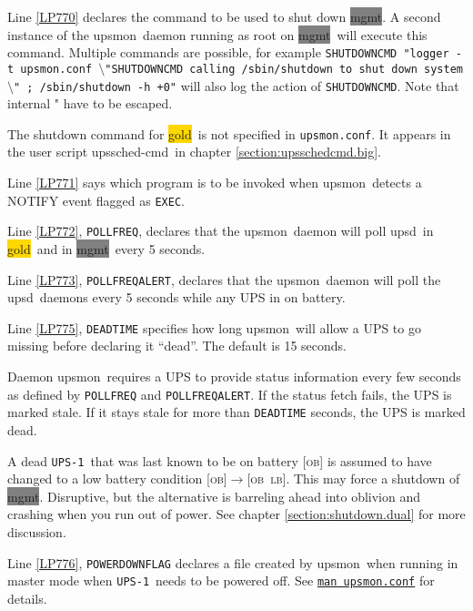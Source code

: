 \documentclass[12pt]{article}
\newcommand{\bsl}{$\setminus$}       %
\newcommand{\upsd}{\mbox{\textcolor{UPSDCOLOUR}{upsd}}}
\newcommand{\upsmon}{\mbox{\textcolor{MONCOLOUR}{upsmon}}}
\newcommand{\upsschedcmd}{\mbox{\textcolor{CMDCOLOUR}{upssched-cmd}}}
\newcommand{\gold}[1][gold]{\colorbox{GOLD}{#1}}
\newcommand{\mgmt}[1][mgmt]{\colorbox{GRAY}{#1}}
\newcommand{\LB}{\textcolor{UPSDCOLOUR}{\textsc{lb}}}
\newcommand{\OB}{\textcolor{UPSDCOLOUR}{\textsc{ob}}}
\newcommand{\status}[1]{\textcolor{UPSDCOLOUR}{[{#1}]}}
\newcommand{\statuschange}[2]{\status{#1}{\allowbreak}\textcolor{UPSDCOLOUR}{$\rightarrow$}{\allowbreak}\status{#2}}
\newcommand{\UPSi}{\texttt{UPS-1}}
\newcommand{\upsmonconf}{\textcolor{MONCOLOUR}{\texttt{upsmon.conf}}}
\newcommand{\NUTman}[1]{\href{http://networkupstools.org/docs/man/#1.html}{\texttt{man #1}}}
\begin{document}
Line \ref{LP770} declares the command to be used to shut down \mgmt.  A second
instance of the \upsmon\ daemon running as root on \mgmt\ will execute this
command.  Multiple commands are possible, for example \texttt{SHUTDOWNCMD
  "logger -t upsmon.conf \bsl"SHUTDOWNCMD calling /sbin/shutdown to shut down
  system\bsl" ; /sbin/shutdown -h +0"} will also log the action of
\texttt{SHUTDOWNCMD}.  Note that internal " have to be escaped.

The shutdown command for \gold\ is not specified in \upsmonconf.  It appears
in the user script \upsschedcmd\ in chapter \ref{section:upsschedcmd.big}.

Line \ref{LP771} says which program is to be invoked when \upsmon\ detects a
NOTIFY event flagged as \texttt{EXEC}.

Line \ref{LP772}, \texttt{POLLFREQ}, declares that the \upsmon\ daemon will
poll \upsd\ in \gold\ and in \mgmt\ every 5 seconds.

Line \ref{LP773}, \texttt{POLLFREQALERT}, declares that the \upsmon\ daemon
will poll the \upsd\ daemons every 5 seconds while any UPS in on battery.

Line \ref{LP775}, \texttt{DEADTIME} specifies how long \upsmon\ will allow a
UPS to go missing before declaring it ``dead''. The default is 15 seconds.

Daemon \upsmon\ requires a UPS to provide status information every few seconds
as defined by \texttt{POLLFREQ} and \texttt{POLLFREQALERT}. If the status
fetch fails, the UPS is marked stale. If it stays stale for more than
\texttt{DEADTIME} seconds, the UPS is marked dead.

A dead \UPSi\ that was last known to be on battery \status{\OB} is assumed to
have changed to a low battery condition \statuschange{\OB}{\OB\ \LB}. This may
force a shutdown of \mgmt. Disruptive, but the alternative is barreling ahead
into oblivion and crashing when you run out of power.  See chapter
\ref{section:shutdown.dual} for more discussion.

Line \ref{LP776}, \texttt{POWERDOWNFLAG} declares a file created by
\upsmon\ when running in master mode when \UPSi\ needs to be powered off.  See
\NUTman{upsmon.conf} for details.
\end{document}
